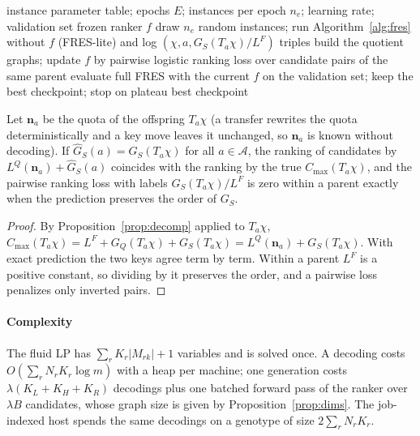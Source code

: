 \begin{algorithm}
\caption{Offline training of the residual ranker}\label{alg:train}
\begin{algorithmic}[1]
\Require instance parameter table; epochs $E$; instances per epoch $n_e$; learning rate; validation set
\Ensure frozen ranker $f$
  \State draw $n_e$ random instances; run Algorithm~\ref{alg:fres} without $f$ (FRES-lite) and log $(\chi, a, G_S(T_a\chi)/L^F)$ triples
  \State build the quotient graphs; update $f$ by pairwise logistic ranking loss over candidate pairs of the same parent
  \State evaluate full FRES with the current $f$ on the validation set; keep the best checkpoint; stop on plateau
\EndFor
\State \Return best checkpoint
\end{algorithmic}
\end{algorithm}

\begin{proposition}\label{prop:consistency}
Let $\mathbf{n}_a$ be the quota of the offspring $T_a\chi$ (a transfer rewrites the quota deterministically and a key move
leaves it unchanged, so $\mathbf{n}_a$ is known without decoding). If $\hat G_S(a) = G_S(T_a\chi)$ for all $a \in \mathcal{A}$,
the ranking of candidates by $L^Q(\mathbf{n}_a) + \hat G_S(a)$ coincides with the ranking by the true $C_{\max}(T_a\chi)$, and
the pairwise ranking loss with labels $G_S(T_a\chi)/L^F$ is zero within a parent exactly when the prediction preserves the order
of $G_S$.
\end{proposition}
\begin{proof}
By Proposition~\ref{prop:decomp} applied to $T_a\chi$, $C_{\max}(T_a\chi) = L^F + G_Q(T_a\chi) + G_S(T_a\chi) =
L^Q(\mathbf{n}_a) + G_S(T_a\chi)$. With exact prediction the two keys agree term by term. Within a parent $L^F$ is a positive
constant, so dividing by it preserves the order, and a pairwise loss penalizes only inverted pairs.
\end{proof}

\paragraph{Complexity} The fluid LP has $\sum_r K_r \lvert M_{rk}\rvert + 1$ variables and is solved once. A decoding costs
$O(\sum_r N_r K_r \log m)$ with a heap per machine; one generation costs $\lambda (K_L + K_H + K_R)$ decodings plus one
batched forward pass of the ranker over $\lambda B$ candidates, whose graph size is given by Proposition~\ref{prop:dims}.
The job-indexed host spends the same decodings on a genotype of size $2\sum_r N_r K_r$.

